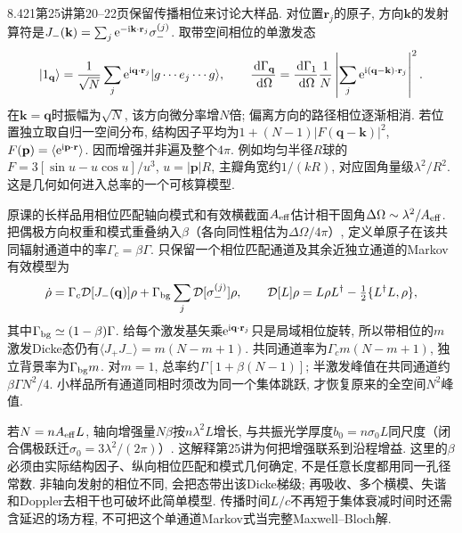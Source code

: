 8.421第25讲第20--22页保留传播相位来讨论大样品. 对位置$\mathbf r_j$的原子, 方向$\mathbf k$的发射算符是$J_-(\mathbf k)=\sum_j\mathrm e^{-\mathrm i\mathbf k\cdot\mathbf r_j}\sigma_-^{(j)}$. 取带空间相位的单激发态
\[\lvert 1_{\mathbf q}\rangle=\frac1{\sqrt N}\sum_j
 \mathrm e^{\mathrm i\mathbf q\cdot\mathbf r_j}\lvert g\cdots e_j\cdots g\rangle,\qquad
 \frac{\,\mathrm d\Gamma_{\mathbf q}}{\,\mathrm d\Omega}
 =\frac{\,\mathrm d\Gamma_1}{\,\mathrm d\Omega}\frac1N
 \left|\sum_j\mathrm e^{\mathrm i(\mathbf q-\mathbf k)\cdot\mathbf r_j}\right|^2.\]
在$\mathbf k=\mathbf q$时振幅为$\sqrt N$, 该方向微分率增$N$倍; 偏离方向的路径相位逐渐相消. 若位置独立取自归一空间分布, 结构因子平均为$1+(N-1)|F(\mathbf q-\mathbf k)|^2$, $F(\mathbf p)=\langle\mathrm e^{\mathrm i\mathbf p\cdot\mathbf r}\rangle$. 因而增强并非遍及整个$4\pi$. 例如均匀半径$R$球的$F=3[\sin u-u\cos u]/u^3$, $u=|\mathbf p|R$, 主瓣角宽约$1/(kR)$, 对应固角量级$\lambda^2/R^2$. 这是几何如何进入总率的一个可核算模型.

原课的长样品用相位匹配轴向模式和有效横截面$A_{\rm eff}$估计相干固角$\Delta\Omega\sim\lambda^2/A_{\rm eff}$. 把偶极方向权重和模式重叠纳入$\beta$（各向同性粗估为$\Delta\Omega/4\pi$）, 定义单原子在该共同辐射通道中的率$\Gamma_c=\beta\Gamma$. 只保留一个相位匹配通道及其余近独立通道的Markov有效模型为
\[\dot\rho=\Gamma_c\mathcal D[J_-(\mathbf q)]\rho
 +\Gamma_{\rm bg}\sum_j\mathcal D[\sigma_-^{(j)}]\rho,\qquad
 \mathcal D[L]\rho=L\rho L^\dagger-\tfrac12\{L^\dagger L,\rho\},\]
其中$\Gamma_{\rm bg}\simeq(1-\beta)\Gamma$. 给每个激发基矢乘$\mathrm e^{\mathrm i\mathbf q\cdot\mathbf r_j}$只是局域相位旋转, 所以带相位的$m$激发Dicke态仍有$\langle J_+J_-\rangle=m(N-m+1)$. 共同通道率为$\Gamma_c m(N-m+1)$, 独立背景率为$\Gamma_{\rm bg}m$. 对$m=1$, 总率约$\Gamma[1+\beta(N-1)]$; 半激发峰值在共同通道约$\beta\Gamma N^2/4$. 小样品所有通道同相时须改为同一个集体跳跃, 才恢复原来的全空间$N^2$峰值.

若$N=nA_{\rm eff}L$, 轴向增强量$N\beta$按$n\lambda^2L$增长, 与共振光学厚度$b_0=n\sigma_0L$同尺度（闭合偶极跃迁$\sigma_0=3\lambda^2/(2\pi)$）. 这解释第25讲为何把增强联系到沿程增益. 这里的$\beta$必须由实际结构因子、纵向相位匹配和模式几何确定, 不是任意长度都用同一孔径常数. 非轴向发射的相位不同, 会把态带出该Dicke梯级; 再吸收、多个横模、失谐和Doppler去相干也可破坏此简单模型. 传播时间$L/c$不再短于集体衰减时间时还需含延迟的场方程, 不可把这个单通道Markov式当完整Maxwell--Bloch解.
